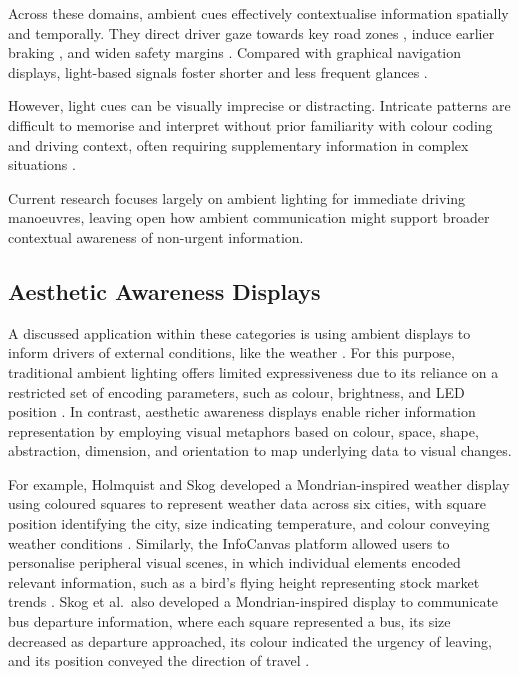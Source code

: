 \documentclass[
english,                 %
bibtex,                  %
includeExtraAbstracts, %
]{kththesis}
\numberwithin{listing}{chapter}
\begin{document}
Across these domains, ambient cues effectively contextualise information spatially and temporally. They direct driver gaze towards key road zones \cite{pomarjanschiSimpleGazeContingentCues2013}, induce earlier braking \cite{laquaiLargeScaleLEDArray2011}, and widen safety margins \cite{lockenSupportingLaneChange2015}. Compared with graphical navigation displays, light-based signals foster shorter and less frequent glances \cite{matviienkoNaviLightInvestigatingAmbient2016}.

However, light cues can be visually imprecise or distracting. Intricate patterns are difficult to memorise and interpret without prior familiarity with colour coding and driving context, often requiring supplementary information in complex situations \cite{lockenEnlighteningDriversSurvey2016,matviienkoDerivingDesignGuidelines2015,matviienkoNaviLightInvestigatingAmbient2016}.

Current research focuses largely on ambient lighting for immediate driving manoeuvres, leaving open how ambient communication might support broader contextual awareness of non-urgent information.

\subsection{Aesthetic Awareness Displays}
\label{sec:aesthetic-awareness-displays}

A discussed application within these categories is using ambient displays to inform drivers of external conditions, like the weather \cite{lockenAdaptiveAmbientInVehicle2017}. For this purpose, traditional ambient lighting offers limited expressiveness due to its reliance on a restricted set of encoding parameters, such as colour, brightness, and LED position \cite{matviienkoNewAmbientLight2015}. In contrast, aesthetic awareness displays \cite{sheltonAestheticAwarenessDisplay2016} enable richer information representation by employing visual metaphors based on colour, space, shape, abstraction, dimension, and orientation \cite{ferschaInformativeArtDisplay2007} to map underlying data to visual changes.

For example, Holmquist and Skog developed a Mondrian-inspired weather display using coloured squares to represent weather data across six cities, with square position identifying the city, size indicating temperature, and colour conveying weather conditions \cite{holmquistInformativeArtInformation2003}. Similarly, the InfoCanvas platform allowed users to personalise peripheral visual scenes, in which individual elements encoded relevant information, such as a bird’s flying height representing stock market trends \cite{staskoPersonalizedPeripheralInformation2004}. Skog et al.\ also developed a Mondrian-inspired display to communicate bus departure information, where each square represented a bus, its size decreased as departure approached, its colour indicated the urgency of leaving, and its position conveyed the direction of travel \cite{skogAestheticsUtilityDesigning2003}.
\end{document}
